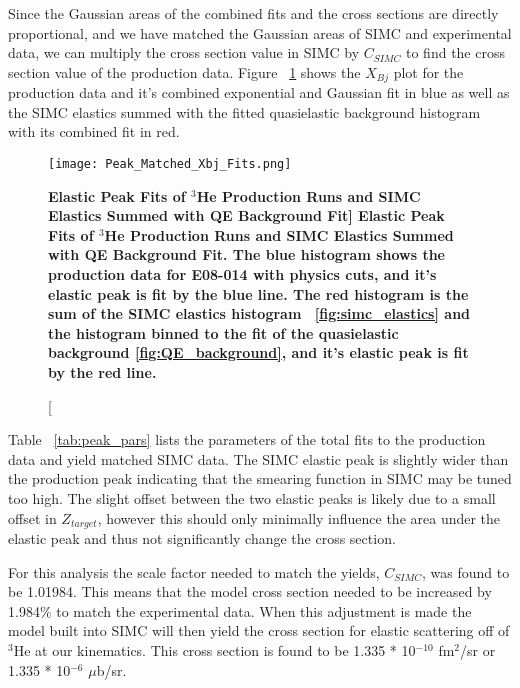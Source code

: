 Since the Gaussian areas of the combined fits and the cross sections are directly proportional, and we have matched the Gaussian areas of SIMC and experimental data, we can multiply the cross section value in SIMC by $C_{SIMC}$ to find the cross section value of the production data. Figure ~\ref{fig:final_xs} shows the $X_{Bj}$ plot for the production data and it's combined exponential and Gaussian fit in blue as well as the SIMC elastics summed with the fitted quasielastic background histogram with its combined fit in red. 

\begin{figure}[!ht]
\begin{center}
\texttt{[image: Peak\_Matched\_Xbj\_Fits.png]}
\end{center}
\caption[\bf{Elastic Peak Fits of $^{3}$He Production Runs and SIMC Elastics Summed with QE Background Fit}]{
{\bf{Elastic Peak Fits of $^{3}$He Production Runs and SIMC Elastics Summed with QE Background Fit.}} The blue histogram shows the production data for E08-014 with physics cuts, and it's elastic peak is fit by the blue line. The red histogram is the sum of the SIMC elastics histogram ~\ref{fig:simc_elastics} and the histogram binned to the fit of the quasielastic background \ref{fig:QE_background}, and it's elastic peak is fit by the red line.}
\label{fig:final_xs}
\end{figure}

Table ~\ref{tab:peak_pars} lists the parameters of the total fits to the production data and yield matched SIMC data. The SIMC elastic peak is slightly wider than the production peak indicating that the smearing function in SIMC may be tuned too high. The slight offset between the two elastic peaks is likely due to a small offset in $Z_{target}$, however this should only minimally influence the area under the elastic peak and thus not significantly change the cross section. 

For this analysis the scale factor needed to match the yields, $C_{SIMC}$, was found to be 1.01984. This means that the model cross section needed to be increased by 1.984$\%$ to match the experimental data. When this adjustment is made the model built into SIMC will then yield the cross section for elastic scattering off of $^3$He at our kinematics. This cross section is found to be 1.335 * 10$^{-10}$ fm$^2$/sr or 1.335 * 10$^{-6}$ $\mu$b/sr.


